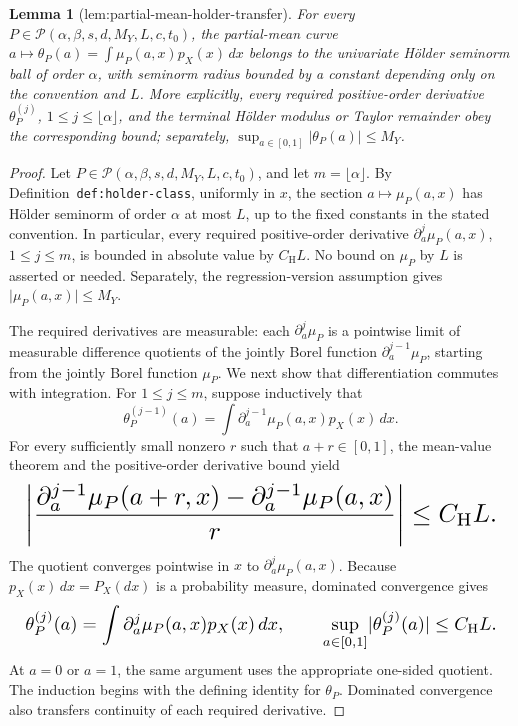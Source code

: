 \documentclass{article}
\newtheorem{lemma}{Lemma}
\begin{document}
\begin{lemma}[lem:partial-mean-holder-transfer]\label{lem:partial-mean-holder-transfer}
For every \(P\in\mathcal P(\alpha,\beta,s,d,M_Y,L,c,t_0)\), the partial-mean curve \(a\mapsto\theta_P(a)=\int\mu_P(a,x)p_X(x)\,dx\) belongs to the univariate Hölder seminorm ball of order \(\alpha\), with seminorm radius bounded by a constant depending only on the convention and \(L\). More explicitly, every required positive-order derivative \(\theta_P^{(j)}\), \(1\le j\le\lfloor\alpha\rfloor\), and the terminal Hölder modulus or Taylor remainder obey the corresponding bound; separately, \(\sup_{a\in[0,1]}\lvert\theta_P(a)\rvert\le M_Y\).
\end{lemma}
\begin{proof}
Let \(P\in\mathcal P(\alpha,\beta,s,d,M_Y,L,c,t_0)\), and let \(m=\lfloor\alpha\rfloor\). By Definition~\texttt{def:holder-class}, uniformly in \(x\), the section \(a\mapsto\mu_P(a,x)\) has Hölder seminorm of order \(\alpha\) at most \(L\), up to the fixed constants in the stated convention. In particular, every required positive-order derivative \(\partial_a^j\mu_P(a,x)\), \(1\le j\le m\), is bounded in absolute value by \(C_{\mathrm H}L\). No bound on \(\mu_P\) by \(L\) is asserted or needed. Separately, the regression-version assumption gives \(\lvert\mu_P(a,x)\rvert\le M_Y\).

The required derivatives are measurable: each \(\partial_a^j\mu_P\) is a pointwise limit of measurable difference quotients of the jointly Borel function \(\partial_a^{j-1}\mu_P\), starting from the jointly Borel function \(\mu_P\). We next show that differentiation commutes with integration. For \(1\le j\le m\), suppose inductively that
\[
\theta_P^{(j-1)}(a)=\int\partial_a^{j-1}\mu_P(a,x)p_X(x)\,dx.
\]
For every sufficiently small nonzero \(r\) such that \(a+r\in[0,1]\), the mean-value theorem and the positive-order derivative bound yield
\[
\makebox[\linewidth][c]{\resizebox{0.98\linewidth}{!}{\(\displaystyle \left\lvert
\frac{\partial_a^{j-1}\mu_P(a+r,x)-\partial_a^{j-1}\mu_P(a,x)}{r}
\right\rvert
\le C_{\mathrm H}L.\)}}
\]
The quotient converges pointwise in \(x\) to \(\partial_a^j\mu_P(a,x)\). Because \(p_X(x)\,dx=P_X(dx)\) is a probability measure, dominated convergence gives
\[
\makebox[\linewidth][c]{\resizebox{0.98\linewidth}{!}{\(\displaystyle \theta_P^{(j)}(a)=\int\partial_a^j\mu_P(a,x)p_X(x)\,dx,
\qquad
\sup_{a\in[0,1]}\lvert\theta_P^{(j)}(a)\rvert\le C_{\mathrm H}L.\)}}
\]
At \(a=0\) or \(a=1\), the same argument uses the appropriate one-sided quotient. The induction begins with the defining identity for \(\theta_P\). Dominated convergence also transfers continuity of each required derivative.


\end{proof}
\end{document}
